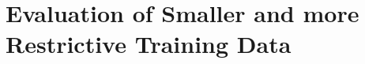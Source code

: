 \begin{table}[h] \centering
{}
\caption{Resnet18 FiveCrop Implementation with and without pre-training. FINAL (regular) means ResNet18 with the resizing of the image instead of cropping and averaging}
\label{tbl:resnet18-1024}
\end{table}

\section{Evaluation of Smaller and more Restrictive Training Data}